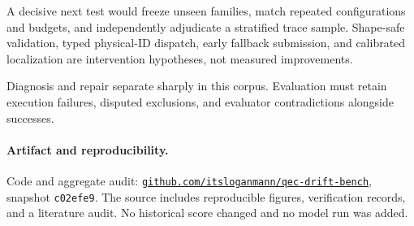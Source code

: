 \documentclass{article}
\newcommand{\code}[1]{\texttt{#1}}
\begin{document}
A decisive next test would freeze unseen families, match repeated configurations and budgets, and independently adjudicate a stratified trace sample. Shape-safe validation, typed physical-ID dispatch, early fallback submission, and calibrated localization are intervention hypotheses, not measured improvements.

Diagnosis and repair separate sharply in this corpus. Evaluation must retain execution failures, disputed exclusions, and evaluator contradictions alongside successes.

\paragraph{Artifact and reproducibility.}
Code and aggregate audit: \href{https://github.com/itsloganmann/qec-drift-bench/tree/c02efe99308605ace6c47cb700382fa9d05af02a}{\texttt{github.com/itsloganmann/qec-drift-bench}}, snapshot \code{c02efe9}. The source includes reproducible figures, verification records, and a literature audit. No historical score changed and no model run was added.

\label{sec:main-end}
\clearpage
\begingroup
\small
\setlength{\bibsep}{3pt plus 1pt}
\balance


\endgroup
\clearpage
\nobalance
\appendix

\end{document}
